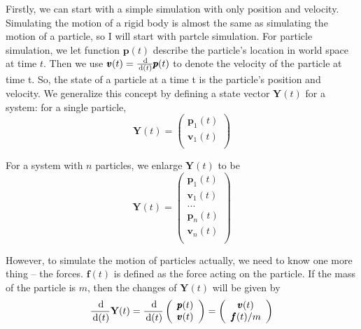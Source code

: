 Firstly, we can start with a simple simulation with only position and velocity. Simulating the motion of a rigid body is almost the same as simulating the motion of a particle, so I will start with partcle simulation. For particle simulation, we let function $\pmb{p}(t)$ describe the particle's location in world space at time $t$. Then we use $\pmb{v}(t)=\frac{\,\mathrm{d}}{\,\mathrm{d}(t)}\pmb{p}(t)$
to denote the velocity of the particle at time t. So, the state of a particle at a time t is the particle's position and velocity. We generalize this concept by defining a state vector $\textbf{Y}(t)$ for a system: for a single particle,
\begin{equation}
    \textbf{Y}(t) = \left(
        \begin{array}{c}
            \pmb{p}_{1}(t) \\
            \pmb{v}_{1}(t) \\
        \end{array}
    \right)
\end{equation}

For a system with $n$ particles, we enlarge $\textbf{Y}(t)$ to be
\begin{equation}
    \textbf{Y}(t) = \left(
    \begin{array}{c}
        \pmb{p}_{1}(t) \\
        \pmb{v}_{1}(t) \\
        ... \\
        \pmb{p}_{n}(t) \\
        \pmb{v}_{n}(t) \\
    \end{array}
    \right)
\end{equation}

However, to simulate the motion of particles actually, we need to know one more thing -- the forces. $\pmb{f}(t)$ is defined as the force acting on the particle. If the mass of the particle is $m$, then the changes of $\textbf{Y}(t)$ will be given by
\begin{equation}
    \frac{\,\mathrm{d}}{\,\mathrm{d}(t)}\textbf{Y}(t) = \frac{\,\mathrm{d}}{\,\mathrm{d}(t)}\left(
        \begin{array}{c}
            \pmb{p}(t) \\
            \pmb{v}(t) \\
        \end{array} \right) = \left(
        \begin{array}{c}
            \pmb{v}(t) \\
            \pmb{f}(t)/m \\
        \end{array} \right)
\end{equation}

